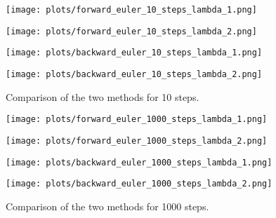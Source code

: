 \documentclass[a4paper,12pt]{article} %
\begin{document}
\begin{figure}[H]
    \centering
    \begin{minipage}{0.45\textwidth}
        \centering
        \texttt{[image: plots/forward\_euler\_10\_steps\_lambda\_1.png]}
    \end{minipage}
    \hfill
    \begin{minipage}{0.45\textwidth}
        \centering
        \texttt{[image: plots/forward\_euler\_10\_steps\_lambda\_2.png]}
    \end{minipage}

    \vspace{0.5cm}

    \begin{minipage}{0.45\textwidth}
        \centering
        \texttt{[image: plots/backward\_euler\_10\_steps\_lambda\_1.png]}
    \end{minipage}
    \hfill
    \begin{minipage}{0.45\textwidth}
        \centering
        \texttt{[image: plots/backward\_euler\_10\_steps\_lambda\_2.png]}
    \end{minipage}

    \caption{Comparison of the two methods for 10 steps.}
\end{figure}

\begin{figure}[H]
    \centering
    \begin{minipage}{0.45\textwidth}
        \centering
        \texttt{[image: plots/forward\_euler\_1000\_steps\_lambda\_1.png]}
    \end{minipage}
    \hfill
    \begin{minipage}{0.45\textwidth}
        \centering
        \texttt{[image: plots/forward\_euler\_1000\_steps\_lambda\_2.png]}
    \end{minipage}

    \vspace{0.5cm}

    \begin{minipage}{0.45\textwidth}
        \centering
        \texttt{[image: plots/backward\_euler\_1000\_steps\_lambda\_1.png]}
    \end{minipage}
    \hfill
    \begin{minipage}{0.45\textwidth}
        \centering
        \texttt{[image: plots/backward\_euler\_1000\_steps\_lambda\_2.png]}
    \end{minipage}

    \caption{Comparison of the two methods for 1000 steps.}
\end{figure}
\end{document}
